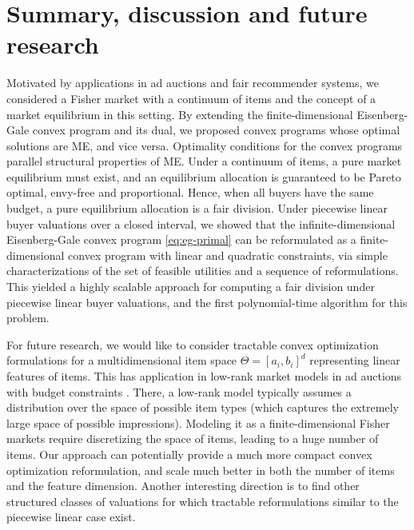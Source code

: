 \section{Summary, discussion and future research}
Motivated by applications in ad auctions and fair recommender systems, we considered a Fisher market with a continuum of items and the concept of a market equilibrium in this setting. 
By extending the finite-dimensional Eisenberg-Gale convex program and its dual, we proposed convex programs whose optimal solutions are ME, and vice versa. 
Optimality conditions for the convex programs parallel structural properties of ME. Under a continuum of items, a pure market equilibrium must exist, and an equilibrium allocation is guaranteed to be Pareto optimal, envy-free and proportional. Hence, when all buyers have the same budget, a pure equilibrium allocation is a fair division.
Under piecewise linear buyer valuations over a closed interval, we showed that the infinite-dimensional Eisenberg-Gale convex program \eqref{eq:eg-primal} can be reformulated as a finite-dimensional convex program with linear and quadratic constraints, via simple characterizations of the set of feasible utilities and a sequence of reformulations. 
This yielded a highly scalable approach for computing a fair division under piecewise linear buyer valuations, and the first polynomial-time algorithm for this problem.

For future research, we would like to consider tractable convex optimization formulations for a multidimensional item space $\Theta = [a_i, b_i]^d$ representing linear features of items. 
This has application in low-rank market models in ad auctions with budget constraints \citep{conitzer2019pacing}. 
There, a low-rank model typically assumes a distribution over the space of possible item types (which captures the extremely large space of possible impressions). Modeling it as a finite-dimensional Fisher markets require discretizing the space of items, leading to a huge number of items. Our approach can potentially provide a much more compact convex optimization reformulation, and scale much better in both the number of items and the feature dimension. Another interesting direction is to find other structured classes of valuations for which tractable reformulations similar to the piecewise linear case exist.

